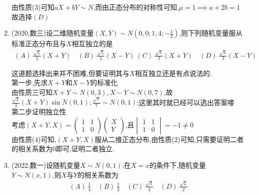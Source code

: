 \documentclass[12pt, a4paper, oneside, UTF8]{ctexbook}
\begin{document}
\begin{enumerate}[label=\arabic*.,start=3]
    \begin{solution}
    由性质(3)可知$aX+bY\sim N$,而由正态分布的对称性可知,$\mu=1\implies a+2b=1$故选择$(D)$ 
    \end{solution}
    
    \item (2020,数三)设二维随机变量$(X,Y)\sim N(0,0;1,4;-\frac{1}{2})$,则下列随机变量服从标准正态分布且与$X$相互独立的是
    \begin{align*}
        (A)\ \frac{\sqrt{5}}{5}(X+Y) \quad (B)\ \frac{\sqrt{5}}{5}(X-Y) \ 
        (C)\ \frac{\sqrt{3}}{3}(X+Y) \quad (D)\ \frac{\sqrt{3}}{3}(X-Y)
    \end{align*}
    
    \begin{solution}
    这道题选择出来并不困难,但要证明其与$X$相互独立还是有点说法的.\\
    第一步,先求$X+Y$和$X-Y$的标准化\\
    由性质三可知$X+Y\sim N(0,3), X-Y\sim N(0,7)$,故
    $\frac{\sqrt{3}}{3}(X+Y)\sin N(0,1); \frac{\sqrt{7}}{7}\sim N(0,1)$;这里其时就已经可以选出答案喽 \\
    第二步证明独立性
    \\考虑$(X+Y, X)=\begin{pmatrix}
        1 & 1 \\
        1 & 0 
    \end{pmatrix}\begin{pmatrix}
        X\\
        Y
    \end{pmatrix}$,且$\begin{vmatrix}
        1 & 1\\
        1 & 0
    \end{vmatrix}=-1\neq 0$ \\
    由性质(4)可知,$(X+Y,X)$服从二维正态分布,由性质(2)可知,只需要证明二者的相关系数为0即可,证明二者独立.\\

    \end{solution}
    \item (2022,数一)设随机变量$X\sim N(0,1)$,在$X=x$的条件下,随机变量$Y\sim N(x,1)$,则$X$与$Y$的相关系数为
    \begin{align*}
        (A)\ \frac{1}{4} \quad (B)\ \frac{1}{2} \quad (C)\ \frac{\sqrt{3}}{3} \quad (D)\ \frac{\sqrt{2}}{2}
    \end{align*}
    

\end{enumerate}
\end{document}
